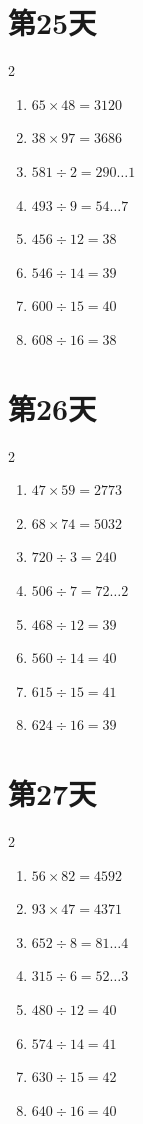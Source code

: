 \documentclass[12pt]{ctexart}
\begin{document}
	\section*{第25天}
	\begin{multicols}{2}
		\begin{enumerate}[itemsep=0pt]
			\item $65 \times 48 = 3120$
			\item $38 \times 97 = 3686$
			\item $581 \div 2 = 290\ldots 1$
			\item $493 \div 9 = 54\ldots 7$
			\item $456 \div 12 = 38$
			\item $546 \div 14 = 39$
			\item $600 \div 15 = 40$
			\item $608 \div 16 = 38$
		\end{enumerate}
	\end{multicols}
	
	\section*{第26天}
	\begin{multicols}{2}
		\begin{enumerate}[itemsep=0pt]
			\item $47 \times 59 = 2773$
			\item $68 \times 74 = 5032$
			\item $720 \div 3 = 240$
			\item $506 \div 7 = 72\ldots 2$
			\item $468 \div 12 = 39$
			\item $560 \div 14 = 40$
			\item $615 \div 15 = 41$
			\item $624 \div 16 = 39$
		\end{enumerate}
	\end{multicols}
	
	\section*{第27天}
	\begin{multicols}{2}
		\begin{enumerate}[itemsep=0pt]
			\item $56 \times 82 = 4592$
			\item $93 \times 47 = 4371$
			\item $652 \div 8 = 81\ldots 4$
			\item $315 \div 6 = 52\ldots 3$
			\item $480 \div 12 = 40$
			\item $574 \div 14 = 41$
			\item $630 \div 15 = 42$
			\item $640 \div 16 = 40$
		\end{enumerate}
	\end{multicols}
	
\end{document}
